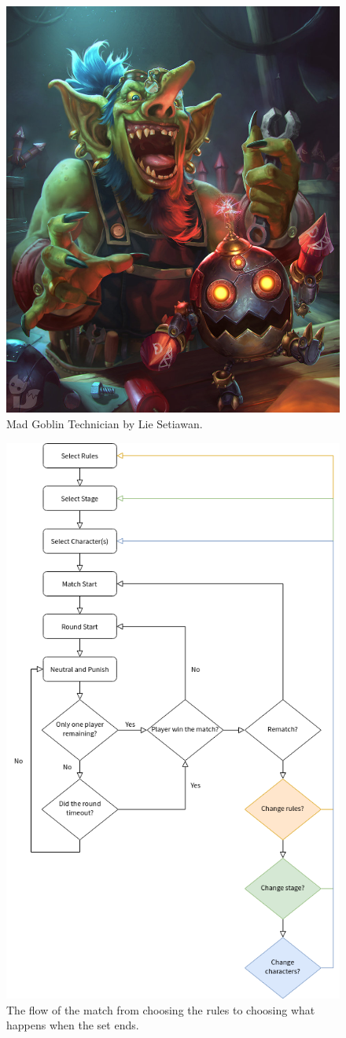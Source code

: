 \begin{figure}[h!]
    \centering
    \includegraphics[width=0.5\linewidth]{images/characters-goblin.jpg}
    \caption{Mad Goblin Technician by Lie Setiawan.\nocite{setiawan_mad_2015}}
\end{figure}

\begin{figure}[h!]
    \centering
    \includegraphics[width=.75\linewidth]{images/flow-match.png}
    \caption{The flow of the match from choosing the rules to choosing what happens when the set ends.}
\end{figure}

